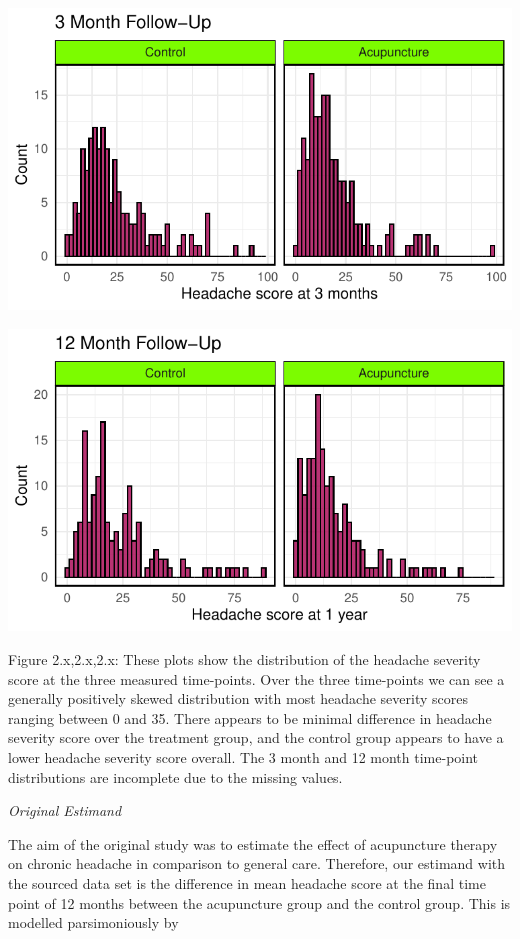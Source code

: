 \documentclass{article}
\begin{document}
\begin{center}\includegraphics{Final_Report_files/figure-latex/unnamed-chunk-7-1} \end{center}

\begin{center}\includegraphics{Final_Report_files/figure-latex/unnamed-chunk-8-1} \end{center}

Figure 2.x,2.x,2.x: These plots show the distribution of the headache
severity score at the three measured time-points. Over the three
time-points we can see a generally positively skewed distribution with
most headache severity scores ranging between 0 and 35. There appears to
be minimal difference in headache severity score over the treatment
group, and the control group appears to have a lower headache severity
score overall. The 3 month and 12 month time-point distributions are
incomplete due to the missing values.

\emph{Original Estimand}

The aim of the original study was to estimate the effect of acupuncture
therapy on chronic headache in comparison to general care. Therefore,
our estimand with the sourced data set is the difference in mean
headache score at the final time point of 12 months between the
acupuncture group and the control group. This is modelled parsimoniously
by
\end{document}
